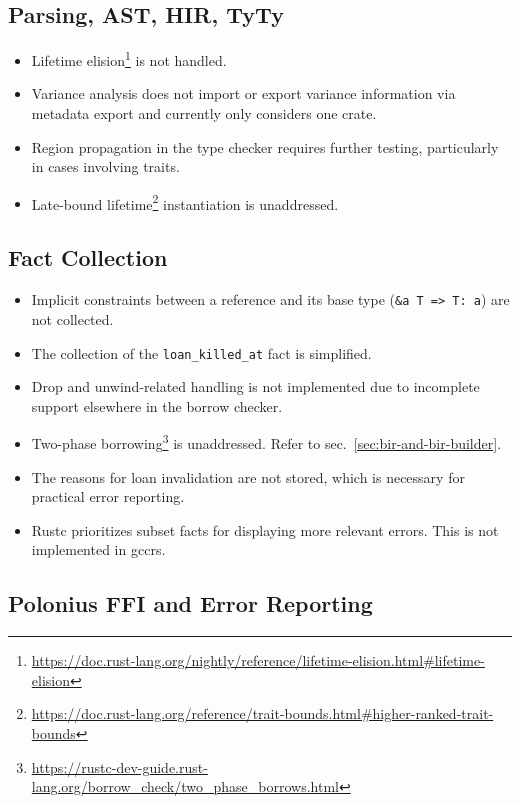 \documentclass[
  11pt,
  twoside,symmetric]{report}
\providecommand{\tightlist}{%
  \setlength{\itemsep}{0pt}\setlength{\parskip}{0pt}}
\DeclareRobustCommand{\href}[2]{#2\footnote{\url{#1}}}
\begin{document}
\subsection{Parsing, AST, HIR, TyTy}\label{sec:parsing-ast-hir-tyty}

\begin{itemize}
\tightlist
\item
  \href{https://doc.rust-lang.org/nightly/reference/lifetime-elision.html\#lifetime-elision}{Lifetime
  elision} is not handled.
\item
  Variance analysis does not import or export variance information via
  metadata export and currently only considers one crate.
\item
  Region propagation in the type checker requires further testing,
  particularly in cases involving traits.
\item
  \href{https://doc.rust-lang.org/reference/trait-bounds.html\#higher-ranked-trait-bounds}{Late-bound
  lifetime} instantiation is unaddressed.
\end{itemize}

\subsection{Fact Collection}\label{sec:fact-collection}

\begin{itemize}
\tightlist
\item
  Implicit constraints between a reference and its base type
  (\texttt{\&\textquotesingle{}a\ T\ =\textgreater{}\ T:\ \textquotesingle{}a})
  are not collected.
\item
  The collection of the \texttt{loan\_killed\_at} fact is simplified.
\item
  Drop and unwind-related handling is not implemented due to incomplete
  support elsewhere in the borrow checker.
\item
  \href{https://rustc-dev-guide.rust-lang.org/borrow_check/two_phase_borrows.html}{Two-phase
  borrowing} is unaddressed. Refer to
  sec.~\ref{sec:bir-and-bir-builder}.
\item
  The reasons for loan invalidation are not stored, which is necessary
  for practical error reporting.
\item
  Rustc prioritizes subset facts for displaying more relevant errors.
  This is not implemented in gccrs.
\end{itemize}

\subsection{Polonius FFI and Error
Reporting}\label{sec:polonius-ffi-and-error-reporting}
\end{document}
